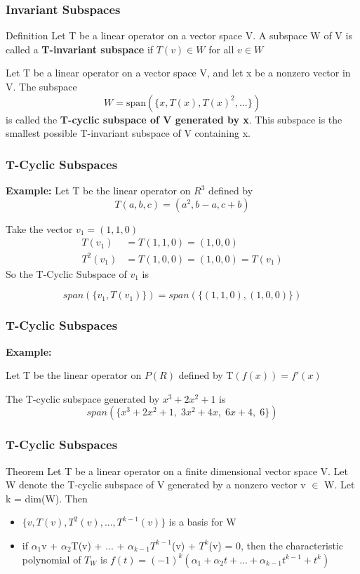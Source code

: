 \documentclass[11pt]{beamer}
\begin{document}
\begin{frame}
	\frametitle{Invariant Subspaces}
	\begin{block}{Definition}
		Let T be a linear operator on a vector space V. A subspace W of V is called a \textbf{T-invariant subspace} if $T(v) \in W$ for all $v \in W$
	\end{block}

		
	\phantom{text}

	Let T be a linear operator on a vector space V, and let x be a nonzero vector in V. The subspace
	\[W = \text{span}(\{ x, T(x), T(x)^{2},... \} ) \]
	is called the \textbf{T-cyclic subspace of V generated by x}. This subspace is the smallest 	possible T-invariant subspace of V containing x.
\end{frame}

\begin{frame}
	\frametitle{T-Cyclic Subspaces}
	\textbf{Example:} Let T be the linear operator on $R^{3}$ defined by
	\[ T(a,b,c) = (a^{2}, b-a, c+b)	\]
	
	Take the vector $v_{1} = (1,1,0)$
	\begin{align*}
		T(v_{1}) &= T(1,1,0) = (1,0,0) \\
		T^{2}(v_{1}) &= T(1,0,0) = (1,0,0) = T(v_{1})
	\end{align*}
	So the T-Cyclic Subspace of $v_{1}$ is
	
	 \[ span(\{ v_{1}, T(v_1)\}) = span(\{(1,1,0), (1,0,0)\}) \]
\end{frame}

\begin{frame}
	\frametitle{T-Cyclic Subspaces}
	\textbf{Example: } 
	
	Let T be the linear operator on $P(R)$ defined by T$(f(x)) = f'(x)$
	
	The T-cyclic subspace generated by $x^3+2x^2+1$ is
	\[ span(\{ x^3+2x^2+1, \; 3x^2+4x, \; 6x+4, \; 6\} )\]
\end{frame}

\begin{frame}
	\frametitle{T-Cyclic Subspaces}
	\begin{block}{Theorem}
		Let T be a linear operator on a finite dimensional vector space V. Let W denote the T-cyclic subspace of V generated by a nonzero vector v $\in$ W. Let k = dim(W). Then
		\begin{itemize}
			\item $\{v, T(v), T^{2}(v),...,T^{k-1}(v) \}$ is a basis for W
			\item if $\alpha_{1}$v + $\alpha_{2}$T(v) + ... + $\alpha_{k-1}T^{k-1}$(v) + $T^{k}$(v) = 0, then the characteristic polynomial of $T_{W}$ is $f(t) = (-1)^{k}(\alpha_{1} + \alpha_2t + ... + \alpha_{k-1}t^{k-1} + t^{k})$
		\end{itemize}
	\end{block}
\end{frame}
\end{document}
